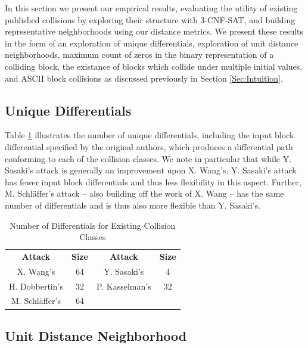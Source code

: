 \documentclass[conference]{IEEEtran}
\begin{document}
In this section we present our empirical results, evaluating the
utility of existing published collisions by exploring their structure
with 3-CNF-SAT, and building representative neighborhoods using our
distance metrics.  We present these results in the form of an
exploration of unique differentials, exploration of unit distance
neighborhoods, maximum count of zeros in the binary representation of
a colliding block, the existance of blocks which collide under
multiple initial values, and ASCII block collisions as discussed
previously in Section \ref{Sec:Intuition}.

\subsection{Unique Differentials} \label{empirical:differentials}

Table \ref{table:differentials} illustrates the number of unique differentials,
including the input block differential specified by the original authors, which produces a differential path conforming to
each of the collision classes. We note in particular that while Y. Sasaki's
attack is generally an improvement upon X. Wang's, Y. Sasaki's attack has fewer
input block differentials and thus less flexibility in this aspect. Further,
M. Schl{\"a}ffer's attack -- also building off the work of X. Wang -- has the
same number of differentials and is thus also more flexible than Y. Sasaki's.

\begin{table}
    \caption{Number of Differentials for Existing Collision Classes}
    \label{table:differentials}
    \begin{tabular}{c c c c}
        \textbf{Attack} & \textbf{Size} & \textbf{Attack} & \textbf{Size} \\
        X. Wang's & 64 & Y. Sasaki's & 4 \\
        H. Dobbertin's & 32 & P. Kasselman's & 32 \\
        M. Schl{\"a}ffer's & 64 & & \\
    \end{tabular}
\end{table}

\subsection{Unit Distance Neighborhood} \label{empirical:neighborhood}
\end{document}

